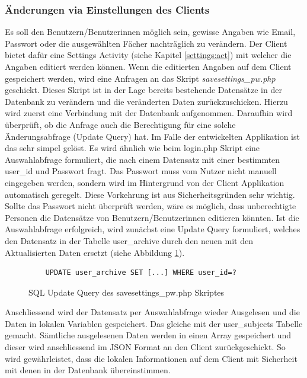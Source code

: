 \documentclass[a4paper,11pt]{report}
\begin{document}
					
					\subsubsection{Änderungen via Einstellungen des Clients}
					Es soll den Benutzern/Benutzerinnen möglich sein, gewisse Angaben wie Email, Passwort oder die ausgewählten Fächer nachträglich zu verändern. Der Client bietet dafür eine Settings Activity (siehe Kapitel \ref{settings:act}) mit welcher die Angaben editiert werden können. Wenn die editierten Angaben auf dem Client gespeichert werden, wird eine Anfragen an das Skript \emph{savesettings\_pw.php} geschickt. Dieses Skript ist in der Lage bereits bestehende Datensätze in der Datenbank zu verändern und die veränderten Daten zurückzuschicken. Hierzu wird zuerst eine Verbindung mit der Datenbank aufgenommen. Daraufhin wird überprüft, ob die Anfrage auch die Berechtigung für eine solche Änderungsabfrage (Update Query) hat. Im Falle der entwickelten Applikation ist das sehr simpel gelöst. Es wird ähnlich wie beim login.php Skript eine Auswahlabfrage formuliert, die nach einem Datensatz mit einer bestimmten user\_id und Passwort fragt. Das Passwort muss vom Nutzer nicht manuell eingegeben werden, sondern wird im Hintergrund von der Client Applikation automatisch geregelt. Diese Vorkehrung ist aus Sicherheitsgründen sehr wichtig. Sollte das Passwort nicht überprüft werden, wäre es möglich, dass unberechtigte Personen die Datensätze von Benutzern/Benutzerinnen editieren könnten. Ist die Auswahlabfrage erfolgreich, wird zunächst eine Update Query formuliert, welches den Datensatz in der Tabelle user\_archive durch den neuen mit den Aktualisierten Daten ersetzt (siehe Abbildung \ref{SQL:UPDATE}).
				\begin{figure} 
					\begin{center}
						\begin{verbatim}
	UPDATE user_archive SET [...] WHERE user_id=?
						\end{verbatim}
						\caption{SQL Update Query des savesettings\_pw.php Skriptes}\label{SQL:UPDATE}
					\end{center}
				\end{figure}
					Anschliessend wird der Datensatz per Auswahlabfrage wieder Ausgelesen und die Daten in lokalen Variablen gespeichert. Das gleiche mit der user\_subjects Tabelle gemacht. Sämtliche ausgelesenen Daten werden in einen Array gespeichert und dieser wird anschliessend im JSON Format an den Client zurückgeschickt. So wird gewährleistet, dass die lokalen Informationen auf dem Client mit Sicherheit mit denen in der Datenbank übereinstimmen.
					
\end{document}
